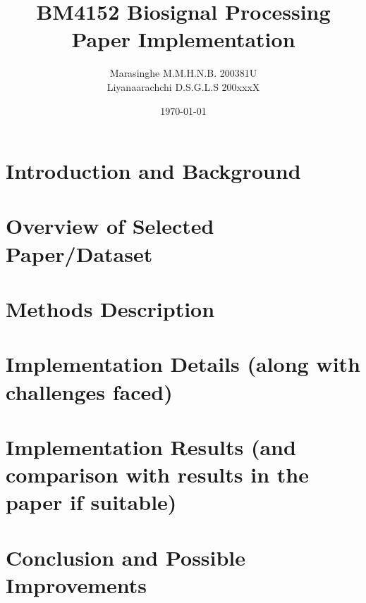 \documentclass{report}
\title{BM4152 Biosignal Processing \\ Paper Implementation}
\author{Marasinghe M.M.H.N.B. \hspace{2em} 200381U \\ 
        Liyanaarachchi D.S.G.L.S \hspace{2em} 200xxxX}
\date{\today}
\begin{document}
\maketitle
\tableofcontents

\chapter{Introduction and Background}


\chapter{Overview of Selected Paper/Dataset}


\chapter{Methods Description}


\chapter{Implementation Details (along with challenges faced)}


\chapter{Implementation Results (and comparison with results in the paper if suitable)}


\chapter{Conclusion and Possible Improvements}

\end{document}
